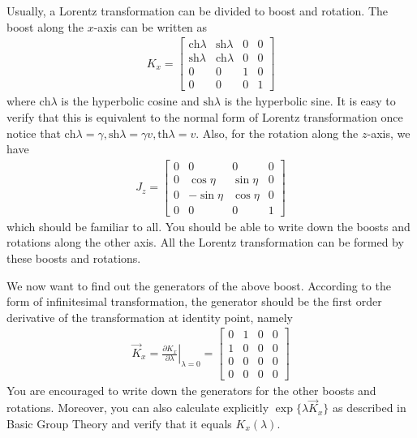 \documentclass[letterpaper,10pt,english]{sphinxmanual}
\begin{document}
Usually, a Lorentz transformation can be divided to boost and rotation. The boost along the \(x\)-axis can be written as
\begin{equation*}
\begin{split}K_x =
\left[
\begin{matrix}
\mathrm{ch}\lambda & \mathrm{sh}\lambda & 0 & 0\\
\mathrm{sh}\lambda & \mathrm{ch}\lambda & 0 & 0\\
0 & 0 & 1 & 0\\
0 & 0 & 0 & 1
\end{matrix}
\right]\end{split}
\end{equation*}
where \(\mathrm{ch}\lambda\) is the hyperbolic cosine and \(\mathrm{sh}\lambda\) is the hyperbolic sine. It is easy to verify that this is equivalent to the normal form of Lorentz transformation once notice that \(\mathrm{ch}\lambda = \gamma, \mathrm{sh}\lambda = \gamma v, \mathrm{th}\lambda = v\). Also, for the rotation along the \(z\)-axis, we have
\begin{equation*}
\begin{split}J_z =
\left[
\begin{matrix}
0 & 0 & 0 & 0\\
0 & \cos\eta& \sin\eta & 0\\
0 & -\sin\eta & \cos\eta & 0\\
0 & 0 & 0 & 1
\end{matrix}
\right]\end{split}
\end{equation*}
which should be familiar to all. You should be able to write down the boosts and rotations along the other axis. All the Lorentz transformation can be formed by these boosts and rotations.

We now want to find out the generators of the above boost. According to the form of infinitesimal transformation, the generator should be the first order derivative of the transformation at identity point, namely
\begin{equation*}
\begin{split}\vec K_x = \left.\frac{\partial K_x}{\partial\lambda}\right|_{\lambda=0} =
\left[
\begin{matrix}
0 & 1 & 0 & 0\\
1 & 0 & 0 & 0\\
0 & 0 & 0 & 0\\
0 & 0 & 0 & 0
\end{matrix}
\right]\end{split}
\end{equation*}
You are encouraged to write down the generators for the other boosts and rotations. Moreover, you can also calculate explicitly \(\exp\{\lambda\vec K_x\}\) as described in Basic Group Theory and verify that it equals \(K_x(\lambda)\).
\end{document}
